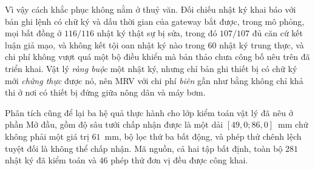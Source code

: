 Vì vậy cách khắc phục không nằm ở thuỷ văn. Đối chiếu nhật ký khai báo với bản ghi lệnh có
chữ ký và dấu thời gian của gateway bắt được, trong mô phỏng, mọi bất đồng ở
$116/116$ nhật ký thật sự bị
sửa, trong đó $107/107$ đủ căn cứ kết luận giả mạo, và không kết tội oan nhật ký nào
trong $60$ nhật ký trung thực, và chi phí không vượt quá một bộ điều khiển mà bản thảo chưa công bố nêu trên đã triển khai. Vật lý \emph{ràng buộc}
một nhật ký, nhưng chỉ bản ghi thiết bị có chữ ký mới \emph{chứng thực} được nó, nên MRV
với chi phí \emph{biên} gần như bằng không chỉ khả thi ở nơi có thiết bị đứng giữa nông
dân và máy bơm.

Phân tích cũng để lại ba hệ quả thực hành cho lớp kiểm toán vật lý đã nêu ở phần Mở
đầu, gồm độ sâu tưới chấp nhận được là một dải $[49{,}0; 86{,}0]$~mm chứ không phải
một giá trị $61$~mm, bộ lọc thứ ba bất động, và phép thử chênh lệch tuyệt đối là
không thể chấp nhận. Mã nguồn, cả hai tập bất định, toàn bộ $281$ nhật ký đã kiểm toán và
$46$ phép thử đơn vị đều được công khai.
